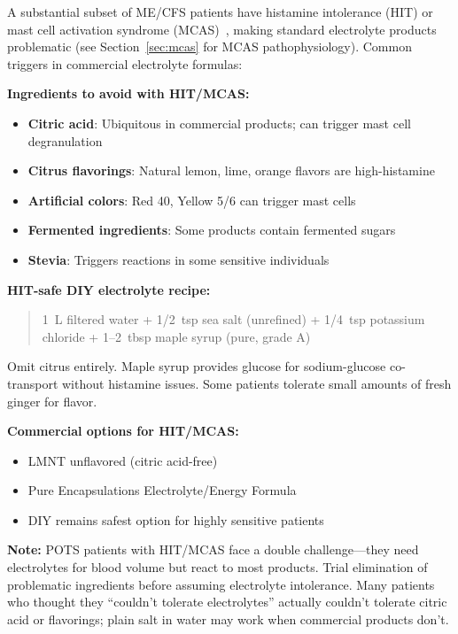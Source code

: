 \begin{warning}
\label{warn:hit-electrolytes}
A substantial subset of ME/CFS patients have histamine intolerance (HIT) or mast cell activation syndrome (MCAS)~\cite{Afrin2017MCAS}, making standard electrolyte products problematic (see Section~\ref{sec:mcas} for MCAS pathophysiology). Common triggers in commercial electrolyte formulas:

\textbf{Ingredients to avoid with HIT/MCAS:}
\begin{itemize}
    \item \textbf{Citric acid}: Ubiquitous in commercial products; can trigger mast cell degranulation
    \item \textbf{Citrus flavorings}: Natural lemon, lime, orange flavors are high-histamine
    \item \textbf{Artificial colors}: Red 40, Yellow 5/6 can trigger mast cells
    \item \textbf{Fermented ingredients}: Some products contain fermented sugars
    \item \textbf{Stevia}: Triggers reactions in some sensitive individuals
\end{itemize}

\textbf{HIT-safe DIY electrolyte recipe:}
\begin{quote}
1~L filtered water + 1/2~tsp sea salt (unrefined) + 1/4~tsp potassium chloride + 1--2~tbsp maple syrup (pure, grade A)
\end{quote}
Omit citrus entirely. Maple syrup provides glucose for sodium-glucose co-transport without histamine issues. Some patients tolerate small amounts of fresh ginger for flavor.

\textbf{Commercial options for HIT/MCAS:}
\begin{itemize}
    \item LMNT unflavored (citric acid-free)
    \item Pure Encapsulations Electrolyte/Energy Formula
    \item DIY remains safest option for highly sensitive patients
\end{itemize}

\textbf{Note:} POTS patients with HIT/MCAS face a double challenge---they need electrolytes for blood volume but react to most products. Trial elimination of problematic ingredients before assuming electrolyte intolerance. Many patients who thought they ``couldn't tolerate electrolytes'' actually couldn't tolerate citric acid or flavorings; plain salt in water may work when commercial products don't.
\end{warning}

